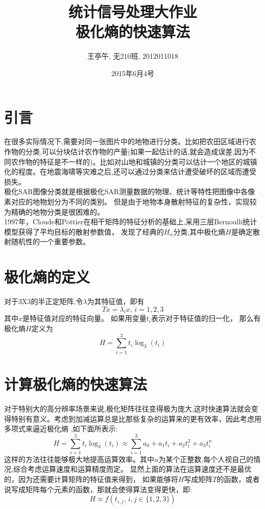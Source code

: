 \documentclass{article}
\begin{document}
\title{统计信号处理大作业\\
极化熵的快速算法}
\author{王亭午, 无210班, 2012011018}
\date{2015年6月4号}
\maketitle
\section{引言}
在很多实际情况下,需要对同一张图片中的地物进行分类。比如把农田区域进行农作物的分类,可以分块估计农作物的产量(如果一起估计的话,就会造成误差,因为不同农作物的特征是不一样的)。比如对山地和城镇的分类可以估计一个地区的城镇化的程度。在地震海啸等灾难之后,还可以通过分类来估计遭受破坏的区域而遭受损失。\\
极化SAR图像分类就是根据极化SAR测量数据的物理、统计等特性把图像中各像素对应的地物划分为不同的类别。
但是由于地物本身散射特征的复杂性，实现较为精确的地物分类是很困难的。\\
1997年，Cloude和Pottier在相干矩阵的特征分析的基础上,采用三层Bernoulli统计模型获得了平均目标的散射参数值，
发现了经典的\(H_\alpha\)分类,其中极化熵\(H\)是确定散射随机性的一个重要参数。
\section{极化熵的定义}
对于3X3的半正定矩阵,令\(\lambda\)为其特征值，即有
\begin{equation}
Tx = \lambda_i x, \, i = 1,2,3
\end{equation}
其中\(x\)是特征值对应的特征向量。
如果用变量\(t_i\)表示对于特征值的归一化，
那么有极化熵\(H\)定义为
\begin{equation}
H = \sum_{i = 1}^3t_i\log_3(t_i)
\end{equation}
\section{计算极化熵的快速算法}
对于特别大的高分辨率场景来说,极化矩阵往往变得极为庞大,这时快速算法就会变得特别有意义。考虑到加减运算总是比那些复杂的运算来的更有效率，因此考虑用多项式来逼近极化熵 ,如下面所表示:
\begin{equation}
H = \sum_{i = 1}^3t_i\log_3(t_i)\approx \sum_{i = 1}^3 a_0 + a_1t_i + a_2t_i^2 + a_3t_i^n
\end{equation}
这样的方法往往能够极大地提高运算效率。其中\(n\)为某个正整数,每个人视自己的情况,综合考虑运算速度和运算精度而定。
显然上面的算法在运算速度还不是最优的，因为还需要计算矩阵的特征值来得到，
如果能够将\(H\)写成矩阵\(T\)的函数，或者说写成矩阵每个元素的函数，那就会使得算法变得更快，即:
\begin{equation}
H \approx f({t_{i,j},\,i,j\in\{1,2,3\}})
\end{equation}
\end{document}

